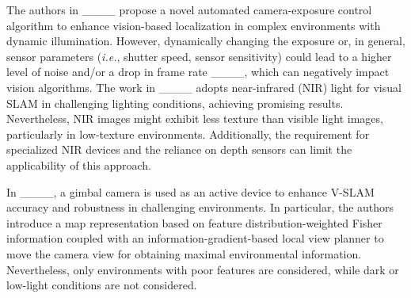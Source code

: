 

The authors in ____  propose a novel automated camera-exposure control algorithm to enhance vision-based localization in complex environments with dynamic illumination. However, dynamically changing the exposure or, in general,  sensor parameters (\textit{i.e.}, shutter speed, sensor sensitivity) could lead to a higher level of noise and/or a drop in frame rate ____, which can negatively impact vision algorithms. The work in ____ adopts near-infrared (NIR) light for visual SLAM in challenging lighting conditions, achieving promising results. Nevertheless, NIR images might exhibit less texture than visible light images, particularly in low-texture environments. Additionally, the requirement for specialized NIR devices and the reliance on depth sensors can limit the applicability of this approach.


In ____, a gimbal camera is used as an active device to enhance V-SLAM accuracy and robustness in challenging environments. In particular, the authors introduce a map representation based on feature distribution-weighted Fisher information coupled with an information-gradient-based local view planner to move the camera view for obtaining maximal environmental information. Nevertheless, only environments with poor features are considered, while dark or low-light conditions are not considered.


